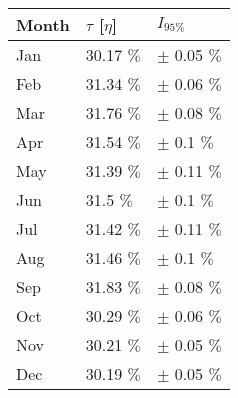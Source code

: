 \begin{tabular}{lll}
\toprule
Month & $\tau$ [$\eta$] &       $I_{95\%}$ \\
\midrule
  Jan &      30.17 $\%$ &  $\pm$ 0.05 $\%$ \\
  Feb &      31.34 $\%$ &  $\pm$ 0.06 $\%$ \\
  Mar &      31.76 $\%$ &  $\pm$ 0.08 $\%$ \\
  Apr &      31.54 $\%$ &   $\pm$ 0.1 $\%$ \\
  May &      31.39 $\%$ &  $\pm$ 0.11 $\%$ \\
  Jun &       31.5 $\%$ &   $\pm$ 0.1 $\%$ \\
  Jul &      31.42 $\%$ &  $\pm$ 0.11 $\%$ \\
  Aug &      31.46 $\%$ &   $\pm$ 0.1 $\%$ \\
  Sep &      31.83 $\%$ &  $\pm$ 0.08 $\%$ \\
  Oct &      30.29 $\%$ &  $\pm$ 0.06 $\%$ \\
  Nov &      30.21 $\%$ &  $\pm$ 0.05 $\%$ \\
  Dec &      30.19 $\%$ &  $\pm$ 0.05 $\%$ \\
\bottomrule
\end{tabular}
